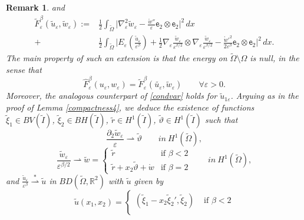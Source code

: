 \documentclass[a4, 11pt, reqno, final]{amsart}
\newcommand{\bbR}{\mathbb{R}}
\newcommand\e{\varepsilon}
\newcommand\weakstar{\stackrel{\ast }{\rightharpoonup}}  %
\newcommand\weak{\rightharpoonup} %
\theoremstyle{plain}%
\newtheorem{remark}[theorem]{Remark}
\begin{document}
\begin{remark}
		and
		\begin{equation}
			\begin{aligned}
			\widetilde{F}^\beta_\e(\widetilde{u}_\e, \widetilde{w}_\e):=  &\frac12\int_{\widetilde{\Omega}}  \Big| \nabla^2_\e \widetilde{w}_\e- \frac{\mathring{w} ''}{\e} \mathsf{e}_2 \otimes \mathsf{e}_2\Big|^2 \, dx\\ + &\frac12\int_{\widetilde{\Omega}} \Big|E_\e (\frac{\widetilde{u}_\e}{\e^\beta}) + \frac12 \nabla_\e \frac{\widetilde{w}_\e}{\e^{\beta/2}}\otimes \nabla_\e\frac{\widetilde{w}_\e}{\e^{\beta/2}} -  \frac{\mathring{w}'^2}{2\e^\beta} \mathsf{e}_2 \otimes \mathsf{e}_2 \Big|^2\, dx.
			\end{aligned}
		\end{equation}
		The main property of such an extension is that the energy on $\widetilde{\Omega}\setminus\Omega$ is null, in the sense that
		\begin{equation}\label{equiv}
			\hat{F}^\beta_\e(u_\e, w_\e) = \widetilde{F}^\beta_\e(\widetilde{u_\e}, \widetilde{w}_\e) \qquad \forall \e>0.\end{equation}
		Moreover, the analogous counterpart of \eqref{condvar} holds for $\widetilde{u}_{1\e}$.
		Arguing as in the proof of Lemma \ref{compactness4}, we deduce the existence of functions $\widetilde{\xi}_1 \in BV(\widetilde{I})$, $\widetilde{\xi}_2 \in BH(\widetilde{I})$, $\widetilde{r} \in H^1(\widetilde{I})$, $\widetilde{\vartheta} \in H^1(\widetilde{I})$ such that
		\begin{equation}\label{18ext}\frac{\partial_{2}\widetilde{w}_\e}{\e} \weak \widetilde{\vartheta}\qquad in \ H^1(\widetilde{\Omega}),\end{equation}
		\begin{equation}\label{19ext}\frac{\widetilde{w}_\e}{\e^{\beta/2}} \weak \widetilde{w}=\begin{cases}
				\widetilde{r} & \text{if }\beta <2\\
				\widetilde{r}+x_2\widetilde{\vartheta}+\mathring{w} & \text{if }\beta =2
			\end{cases}  \qquad in \ H^1(\widetilde{\Omega}),\end{equation}
		and
		$\frac{\widetilde{u}_{\e}}{\e^\beta} \weakstar \widetilde{u}$ in $BD(\widetilde{\Omega}, \bbR^2)$
		with $\widetilde{u}$ given by
		\begin{equation}\label{uext}
			\widetilde{u}(x_1,x_2) = \begin{cases}
				(\widetilde{\xi}_1 - x_2 \widetilde{\xi}_2', \widetilde{\xi}_2) & \text{ if } \beta < 2\\

\end{cases}
\end{equation}
\end{remark}
\end{document}
